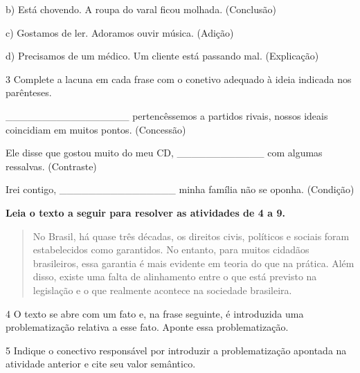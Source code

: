 
b) Está chovendo. A roupa do varal ficou molhada. (Conclusão)


c) Gostamos de ler. Adoramos ouvir música. (Adição)


d) Precisamos de um médico. Um cliente está passando mal. (Explicação)


\num{3} Complete a lacuna em cada frase com o conetivo adequado à ideia
indicada nos parênteses.

\_\_\_\_\_\_\_\_\_\_\_\_\_\_\_\_\_  pertencêssemos a
partidos rivais, nossos ideais coincidiam em muitos pontos. (Concessão)

Ele disse que gostou muito do meu CD,
\_\_\_\_\_\_\_\_\_\_\_\_  com algumas ressalvas. (Contraste)

Irei contigo, \_\_\_\_\_\_\_\_\_\_\_\_\_\_\_\_  minha
família não se oponha. (Condição)

\textbf{Leia o texto a seguir para resolver as atividades de 4 a 9.}

\begin{quote}
No Brasil, há quase três décadas, os direitos civis, políticos e sociais
foram estabelecidos como garantidos. No entanto, para muitos cidadãos
brasileiros, essa garantia é mais evidente em teoria do que na prática.
Além disso, existe uma falta de alinhamento entre o que está previsto na
legislação e o que realmente acontece na sociedade brasileira.
\end{quote}


\num{4} O texto se abre com um fato e, na frase seguinte, é introduzida
uma problematização relativa a esse fato. Aponte essa problematização.


\num{5} Indique o conectivo responsável por introduzir a problematização
apontada na atividade anterior e cite seu valor semântico.

